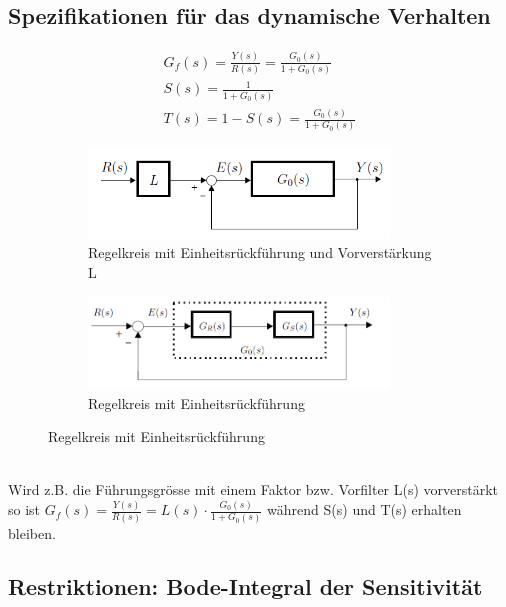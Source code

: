 \subsection{Spezifikationen für das dynamische Verhalten}
\begin{eqnarray}
	G_f(s)=\frac{Y(s)}{R(s)}=\frac{G_0(s)}{1+G_0(s)} \\
	S(s)=\frac{1}{1+G_0(s)}\\
	T(s)=1-S(s)=\frac{G_0(s)}{1+G_0(s)}
\end{eqnarray}
\begin{figure}[h!]
	\begin{center}
	\begin{subfigure}[b]{8cm}
		\centering
		\includegraphics[width=8cm]{./images/regelkreismitL.png}
		\caption{Regelkreis mit Einheitsrückführung und Vorverstärkung L}
	\end{subfigure}\qquad
	\begin{subfigure}[b]{8cm}
		\centering
		\includegraphics[width=8cm]{./images/RegelkreisEinheitsrueckfuehrung.png}
		\caption{Regelkreis mit Einheitsrückführung}
	\end{subfigure}
	\end{center}
\end{figure}\\
	Wird z.B. die Führungsgrösse mit einem Faktor bzw. Vorfilter L(s) vorverstärkt so ist $G_f(s)=\frac{Y(s)}{R(s)}=L(s)\cdot\frac{G_0(s)}{1+G_0(s)}$ während S(s) und T(s) erhalten bleiben.

\subsection{Restriktionen: Bode-Integral der Sensitivität}

